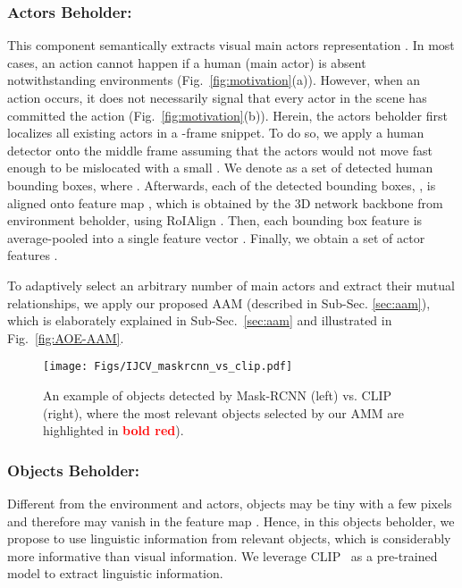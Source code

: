 \documentclass[sn-mathphys]{sn-jnl}
\theoremstyle{thmstyleone}\newtheorem{theorem}{Theorem}\newtheorem{proposition}[theorem]{Proposition}
\theoremstyle{thmstyletwo}\newtheorem{example}{Example}\newtheorem{remark}{Remark}
\theoremstyle{thmstylethree}\newtheorem{definition}{Definition}
\begin{document}
\subsubsection{Actors Beholder:}
\label{subsubsec:actors}
This component semantically extracts visual main actors representation . In most cases, an action cannot happen if a human (main actor) is absent notwithstanding environments (Fig.~\ref{fig:motivation}(a)). However, when an action occurs, it does not necessarily signal that every actor in the scene has committed the action (Fig.~\ref{fig:motivation}(b)). Herein, the actors beholder first localizes all existing actors in a -frame snippet. To do so, we apply a human detector onto the middle frame assuming that the actors would not move fast enough to be mislocated with a small . We denote  as a set of detected human bounding boxes, where . Afterwards, each of the detected bounding boxes, , is aligned onto feature map , which is obtained by the 3D network backbone from environment beholder, using RoIAlign \cite{MaskRCNN_ICCV17}. Then, each bounding box feature is average-pooled into a single feature vector . Finally, we obtain a set of actor features .

To adaptively select an arbitrary number of main actors and extract their mutual relationships, we apply our proposed AAM (described in Sub-Sec. \ref{sec:aam}), which is elaborately explained in Sub-Sec.~\ref{sec:aam} and illustrated in Fig.~\ref{fig:AOE-AAM}.

\begin{figure}[!t]
    \centering
    \texttt{[image: Figs/IJCV\_maskrcnn\_vs\_clip.pdf]}
    \caption{An example of objects detected by Mask-RCNN \cite{MaskRCNN_ICCV17} (left) vs. CLIP (right), where the most relevant objects selected by our AMM are highlighted in \textbf{\textcolor{red}{bold red}}).}
    \label{fig:maskrcnn_vs_clip}
\end{figure}

\subsubsection{Objects Beholder:}
\label{subsubsec:objects}
Different from the environment and actors, objects may be tiny with a few pixels and therefore may vanish in the feature map . Hence, in this objects beholder, we propose to use linguistic information from relevant objects, which is considerably more informative than visual information. We leverage CLIP~\cite{radford2021learning} as a pre-trained model to extract linguistic information.
\end{document}
